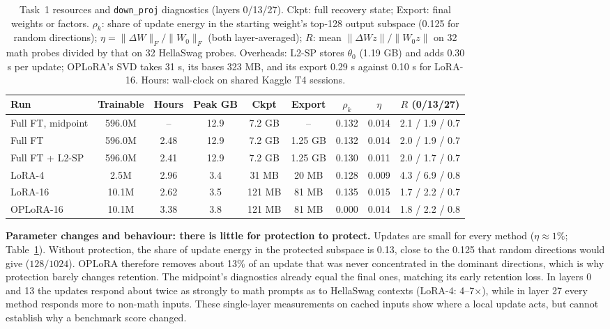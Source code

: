 \documentclass{article}
\begin{document}
\begin{table}[t]
\centering
\caption{Task~1 resources and \texttt{down\_proj} diagnostics (layers 0/13/27). Ckpt: full recovery state; Export: final weights or factors. $\rho_k$: share of update energy in the starting weight's top-128 output subspace (0.125 for random directions); $\eta=\|\Delta W\|_F/\|W_0\|_F$ (both layer-averaged); $R$: mean $\|\Delta W z\|/\|W_0z\|$ on 32 math probes divided by that on 32 HellaSwag probes. Overheads: L2-SP stores $\theta_0$ (1.19 GB) and adds 0.30 s per update; OPLoRA's SVD takes 31 s, its bases 323 MB, and its export 0.29 s against 0.10 s for LoRA-16. Hours: wall-clock on shared Kaggle T4 sessions.}
\label{tab:t1-res}
\small
\setlength{\tabcolsep}{4pt}
\begin{tabular}{lcccccccc}
\toprule
Run & Trainable & Hours & Peak GB & Ckpt & Export & $\rho_k$ & $\eta$ & $R$ (0/13/27)\\
\midrule
Full FT, midpoint & 596.0M & -- & 12.9 & 7.2 GB & -- & 0.132 & 0.014 & 2.1 / 1.9 / 0.7\\
Full FT & 596.0M & 2.48 & 12.9 & 7.2 GB & 1.25 GB & 0.132 & 0.014 & 2.0 / 1.9 / 0.7\\
Full FT + L2-SP & 596.0M & 2.41 & 12.9 & 7.2 GB & 1.25 GB & 0.130 & 0.011 & 2.0 / 1.7 / 0.7\\
LoRA-4 & 2.5M & 2.96 & 3.4 & 31 MB & 20 MB & 0.128 & 0.009 & 4.3 / 6.9 / 0.8\\
LoRA-16 & 10.1M & 2.62 & 3.5 & 121 MB & 81 MB & 0.135 & 0.015 & 1.7 / 2.2 / 0.7\\
OPLoRA-16 & 10.1M & 3.38 & 3.8 & 121 MB & 81 MB & 0.000 & 0.014 & 1.8 / 2.2 / 0.8\\
\bottomrule
\end{tabular}
\end{table}

\textbf{Parameter changes and behaviour: there is little for protection to protect.} Updates are small for every method ($\eta\approx1\%$; Table~\ref{tab:t1-res}). Without protection, the share of update energy in the protected subspace is 0.13, close to the 0.125 that random directions would give ($128/1024$). OPLoRA therefore removes about 13\% of an update that was never concentrated in the dominant directions, which is why protection barely changes retention. The midpoint's diagnostics already equal the final ones, matching its early retention loss. In layers 0 and 13 the updates respond about twice as strongly to math prompts as to HellaSwag contexts (LoRA-4: 4--7$\times$), while in layer 27 every method responds more to non-math inputs. These single-layer measurements on cached inputs show where a local update acts, but cannot establish why a benchmark score changed.
\end{document}

